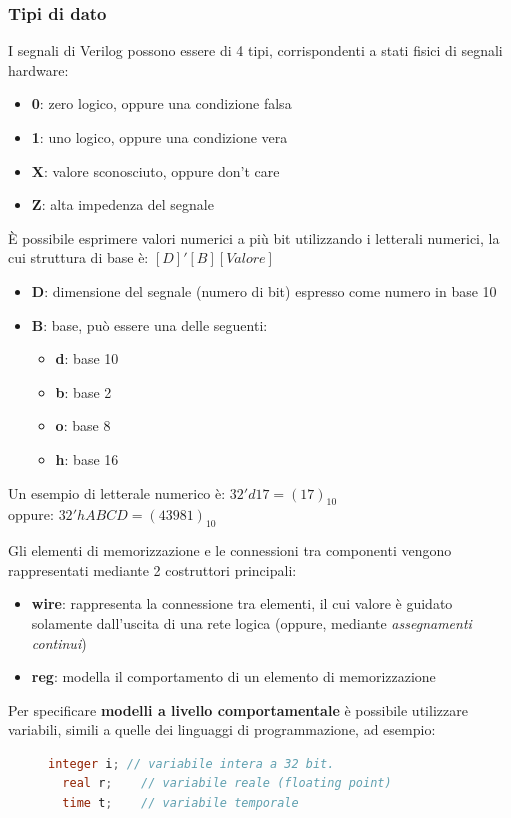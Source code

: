 \documentclass[a4paper]{article}
\theoremstyle{break}
\theoremstyle{break}
\theoremstyle{break}
\theoremstyle{break}
\begin{document}
\subsubsection{Tipi di dato}
I segnali di Verilog possono essere di 4 tipi, corrispondenti a stati fisici di segnali
hardware:
\begin{itemize}
  \item \textbf{0}: zero logico, oppure una condizione falsa
  \item \textbf{1}: uno logico, oppure una condizione vera
  \item \textbf{X}: valore sconosciuto, oppure don't care
  \item \textbf{Z}: alta impedenza del segnale
\end{itemize}
È possibile esprimere valori numerici a più bit utilizzando i letterali numerici,
la cui struttura di base è: \( [D]'[B][Valore] \) 
\begin{itemize}
  \item \textbf{D}: dimensione del segnale (numero di bit) espresso come numero in base 10
  \item \textbf{B}: base, può essere una delle seguenti:
    \begin{itemize}
      \item \textbf{d}: base 10
      \item \textbf{b}: base 2
      \item \textbf{o}: base 8
      \item \textbf{h}: base 16
    \end{itemize}
\end{itemize}
Un esempio di letterale numerico è: \( 32'd17 = (17)_{10} \)\\
oppure: \( 32'hABCD = (43981)_{10} \)\\
\vspace{1em}

Gli elementi di memorizzazione e le connessioni tra componenti vengono rappresentati mediante
2 costruttori principali:
\begin{itemize}
  \item \textbf{wire}: rappresenta la connessione tra elementi, il cui valore è guidato
    solamente dall'uscita di una rete logica (oppure, mediante \emph{assegnamenti continui})
  \item \textbf{reg}: modella il comportamento di un elemento di memorizzazione
\end{itemize}
Per specificare \textbf{modelli a livello comportamentale} è possibile utilizzare variabili,
simili a quelle dei linguaggi di programmazione, ad esempio:
\begin{figure}[H]
  \begin{lstlisting}[language=Verilog]
  integer i; // variabile intera a 32 bit.
  real r;    // variabile reale (floating point)
  time t;    // variabile temporale
  \end{lstlisting}
\end{figure}
\end{document}

